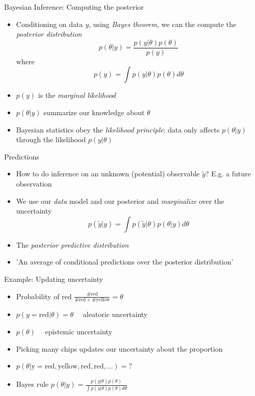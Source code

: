 \documentclass[10pt]{beamer}
\begin{document}
\begin{frame}{Bayesian Inference: Computing the posterior}
  \begin{itemize}
  \item Conditioning on data $y$, using \emph{Bayes theorem}, we can the compute the \emph{posterior distribution}
  \[
  p(\theta|y) = \frac{p(y|\theta) p(\theta)}{p(y)}
  \]
  where
  \[
  p(y) = \int p(y|\theta) p(\theta) d\theta
  \]
  \pause
  \item $p(y)$ is the \emph{marginal likelihood}
  \pause
  \item $p(\theta|y)$ summarize our knowledge about $\theta$
  \pause
  \item Bayesian statistics obey the \emph{likelihood principle}: data only affects $p(\theta|y)$ through the likelihood $p(y|\theta)$
  \end{itemize}
\end{frame}


\begin{frame}{Predictions}
  \begin{itemize}
  \item How to do inference on an unknown (potential) observable $\tilde{y}$? E.g. a future observation
  \pause
  \item We use our \emph{data} model and our posterior and \emph{marginalize} over the uncertainty
  \[
  p(\tilde{y}|y) = \int p(\tilde{y}|\theta) p(\theta|y) d\theta
  \]
  \item The \emph{posterior predictive distribution}
  \item 'An average of conditional predictions over the posterior distribution'
  \end{itemize}
\end{frame}


\begin{frame}{Example: Updating uncertainty}

  \begin{itemize}
  \item<2-> Probability of red $\frac{\mathrm{\#red}}{\mathrm{\#red+\#yellow}}=\theta$
    \vspace{\baselineskip}
  \item<3-> $p(y=\mathrm{red}|\theta)=\theta \quad$ aleatoric uncertainty
    \vspace{\baselineskip}
  \item<4-> $p(\theta) \quad$ epistemic uncertainty
    \vspace{\baselineskip}
  \item<5-> Picking many chips updates our uncertainty about the proportion
    \vspace{\baselineskip}
  \item<5-> $p(\theta|\mathrm{y=red,yellow,red,red,\ldots})=?$
    \vspace{\baselineskip}
  \item<6-> Bayes rule
      $p(\theta|y)=\frac{p(y|\theta)p(\theta)}{\int p(y|\theta)p(\theta) d\theta}$
  \end{itemize}
\end{frame}
\end{document}
